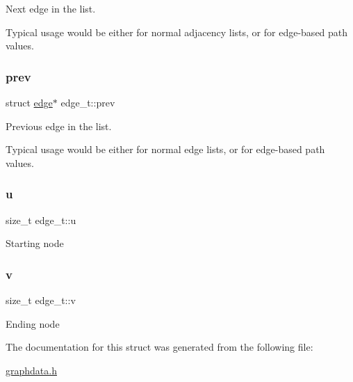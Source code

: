Next edge in the list. 

Typical usage would be either for normal adjacency lists, or for edge-\/based path values. \mbox{\label{structedge__t_a67691a9d896d973292ad9cf3e8901111}} 
\subsubsection{\texorpdfstring{prev}{prev}}
{\footnotesize\ttfamily struct \hyperlink{graphdata_8h_a641a8a4cd064e02a13e6c15d1b2df541}{edge}$\ast$ edge\+\_\+t\+::prev}



Previous edge in the list. 

Typical usage would be either for normal edge lists, or for edge-\/based path values. \mbox{\label{structedge__t_a2bd21781f62242a78e70595ea781769c}} 
\subsubsection{\texorpdfstring{u}{u}}
{\footnotesize\ttfamily size\+\_\+t edge\+\_\+t\+::u}

Starting node \mbox{\label{structedge__t_a23bf912e6f3c953e2f8577ab7c692e85}} 
\subsubsection{\texorpdfstring{v}{v}}
{\footnotesize\ttfamily size\+\_\+t edge\+\_\+t\+::v}

Ending node 

The documentation for this struct was generated from the following file\+:\begin{DoxyCompactItemize}
\item 
\hyperlink{graphdata_8h}{graphdata.\+h}\end{DoxyCompactItemize}
